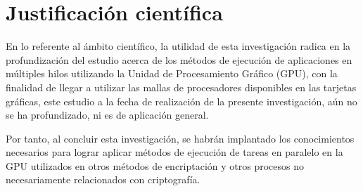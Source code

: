 \documentclass[../main/main.tex]{subfiles}
\begin{document}
  \section{Justificación científica}

  En lo referente al ámbito científico, la utilidad de esta investigación radica en la profundización del estudio acerca de los métodos de ejecución de aplicaciones en múltiples hilos utilizando la Unidad de Procesamiento Gráfico (GPU), con la finalidad de llegar a utilizar las mallas de procesadores disponibles en las tarjetas gráficas, este estudio a la fecha de realización de la presente investigación, aún no se ha profundizado, ni es de aplicación general.

  Por tanto, al concluir esta investigación, se habrán implantado los conocimientos necesarios para lograr aplicar métodos de ejecución de tareas en paralelo en la GPU utilizados en otros métodos de encriptación y otros procesos no necesariamente relacionados con criptografía.

  \bibliografia
\end{document}
